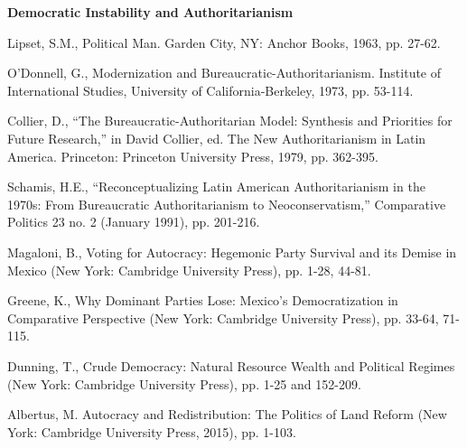 \documentclass[letterpaper]{article}
\renewenvironment{itemize}{
  \begin{list}{}{
    \setlength{\leftmargin}{1.5em}
  }
}{
  \end{list}
}
\begin{document}
\begin{enumerate}
\item {\bf Democratic Instability and Authoritarianism}
	\begin{itemize}
		\item[$\bullet$] Lipset, S.M., Political Man. Garden City, NY: Anchor Books, 1963, pp. 27-62.
		\item[$\bullet$] O'Donnell, G., Modernization and Bureaucratic-Authoritarianism. Institute of International Studies, University of California-Berkeley, 1973, pp. 53-114.
		\item[$\bullet$] Collier, D., ``The Bureaucratic-Authoritarian Model: Synthesis and Priorities for Future Research,'' in David Collier, ed. The New Authoritarianism in Latin America. Princeton: Princeton University Press, 1979, pp. 362-395.
		\item[$\bullet$] Schamis, H.E., ``Reconceptualizing Latin American Authoritarianism in the 1970s: From Bureaucratic Authoritarianism to Neoconservatism,'' Comparative Politics 23 no. 2 (January 1991), pp. 201-216.
		\item[$\bullet$] Magaloni, B., Voting for Autocracy: Hegemonic Party Survival and its Demise in Mexico (New York: Cambridge University Press), pp. 1-28, 44-81.
		\item[$\bullet$] Greene, K., Why Dominant Parties Lose: Mexico's Democratization in Comparative Perspective (New York: Cambridge University Press), pp. 33-64, 71-115.
		\item[$\bullet$] Dunning, T., Crude Democracy: Natural Resource Wealth and Political Regimes (New York: Cambridge University Press), pp. 1-25 and 152-209.
		\item[$\bullet$] Albertus, M. Autocracy and Redistribution: The Politics of Land Reform (New York: Cambridge University Press, 2015), pp. 1-103.
	\end{itemize}




\end{enumerate}
\end{document}

